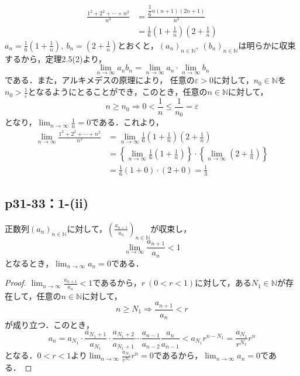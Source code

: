 \documentclass[uplatex,dvipdfmx,a4paper,10pt,fleqn]{jsarticle}
\begin{document}
\begin{tleftbar}
	\begin{align*}
		\frac{1^2+2^2+\cdots+n^2}{n^3} & = \frac{\dfrac{1}{6}n(n+1)(2n+1)}{n^3} \\
		& =\frac{1}{6} \left(1+\frac{1}{n} \right ) \left(2+\frac{1}{n} \right)
	\end{align*}
	$a_n = \frac{1}{6} \left(1+\frac{1}{n} \right ),~b_n = \left(2+\frac{1}{n} \right)$とおくと，$(a_n)_{n \in \mathbb{N}},~(b_n)_{n \in \mathbb{N}}$は明らかに収束するから，定理2.5(2)より，
	\[
		\lim_{n \to \infty} a_n b_n = \lim_{n \to \infty} a_n \cdot  \lim_{n \to \infty} b_n 
	\]
	である．また，アルキメデスの原理により， 任意の$\varepsilon >0$に対して，$n_0 \in \mathbb{N}$を$n_0 >\frac{1}{\varepsilon}$となるようにとることができ，このとき，任意の$n \in \mathbb{N}$に対して，
	\[
		n \ge n_0 \Longrightarrow 0<\frac{1}{n} \le \frac{1}{n_0} = \varepsilon
	\]
	となり，$\lim_{n \to \infty} \frac{1}{n} =0$である．これより，
	\begin{align*}
		\lim_{n \to \infty} \frac{1^2+2^2+\cdots+n^2}{n^3} & = \lim_{n \to \infty} \frac{1}{6} \left(1+\frac{1}{n} \right ) \left(2+\frac{1}{n} \right) \\
		& = \left \{\lim_{n \to \infty} \frac{1}{6} \left(1+\frac{1}{n} \right ) \right \} \cdot \left \{\lim_{n \to \infty} \left(2+\frac{1}{n} \right ) \right \} \\
		& = \frac{1}{6} (1+0) \cdot (2+0) =\frac{1}{3}
	\end{align*}
\end{tleftbar}


\subsection*{p31-33：1-(ii)}



    正数列$(a_n)_{n \in \mathbb{N}}$に対して，$\left(\frac{a_{n+1}}{a_n} \right)_{n \in \mathbb{N}}$が収束し，
    \[
    \lim_{n \to \infty} \frac{a_{n+1}}{a_n} <1
    \]
    となるとき，$\lim_{n \to \infty} a_n =0$である．

\begin{proof}
   $ \lim_{n \to \infty} \frac{a_{n+1}}{a_n} <1$であるから，$r~(0<r<1)$に対して，ある$N_1 \in \mathbb{N}$が存在して，任意の$n \in \mathbb{N}$に対して，
   \[
       n \ge N_1 \Longrightarrow \frac{a_{n+1}}{a_n}<r
   \]
   が成り立つ．このとき，
   \[
       a_n = a_{N_1} \cdot \frac{a_{N_1+1}}{a_{N_1}} \cdot \frac{a_{N_1 +2}}{a_{N_1 +1}} \dotsm \frac{a_{n-1}}{a_{n-2}} \frac{a_n}{a_{n-1}}< a_{N_1} r^{n-N_1}=\frac{a_{N_1}}{r^{N_1}} r^n
   \]
   となる．$0<r<1$より$\lim_{n \to \infty} \frac{a_{N_1}}{r^{N_1}} r^n =0$であるから，$\lim_{n \to \infty} a_n =0$である．
\end{proof}
\end{document}
